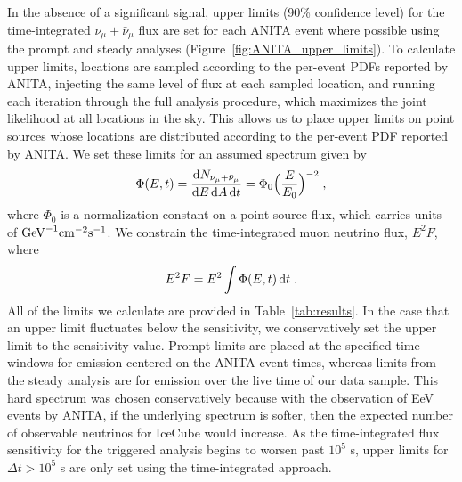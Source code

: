 In the absence of a significant signal, upper limits (90\% confidence level) for the time-integrated $\nu_{\mu} + \bar{\nu}_{\mu}$ flux are set for each ANITA event where possible using the prompt and steady analyses (Figure~\ref{fig:ANITA_upper_limits}). To calculate upper limits, locations are sampled according to the per-event PDFs reported by ANITA, injecting the same level of flux at each sampled location, and running each iteration through the full analysis procedure, which maximizes the joint likelihood at all locations in the sky. This allows us to place upper limits on point sources whose locations are distributed according to the per-event PDF reported by ANITA. We set these limits for an assumed spectrum given by
\begin{equation}
    \Phi (E, t) = \frac{\mathop{}\!\mathrm{d} N_{\nu_{\mu} + \bar{\nu}_{\mu}}}{\mathop{}\!\mathrm{d} E \mathop{}\!\mathrm{d} A \mathop{}\!\mathrm{d} t} =  \Phi_0 \Big(\frac{E}{E_0}\Big)^{-2} \; , 
\end{equation}
where $\Phi_0$ is a normalization constant on a point-source flux, which carries units of $\rm{GeV}^{-1}\rm{cm}^{-2}\rm{s}^{-1}$. We constrain the time-integrated muon neutrino flux, $E^2F$, where 
\begin{equation}
    E^2 F = E^2 \int \Phi(E, t) \mathop{}\!\mathrm{d} t \; .
\end{equation} 
All of the limits we calculate are provided in Table~\ref{tab:results}. In the case that an upper limit fluctuates below the sensitivity, we conservatively set the upper limit to the sensitivity value. Prompt limits are placed at the specified time windows for emission centered on the ANITA event times, whereas limits from the steady analysis are for emission over the live time of our data sample. This hard spectrum was chosen conservatively because with the observation of EeV events by ANITA, if the underlying spectrum is softer, then the expected number of observable neutrinos for IceCube would increase. As the time-integrated flux sensitivity for the triggered analysis begins to worsen past $10^5$ s, upper limits for $\Delta t > 10^5$ s are only set using the time-integrated approach. 

